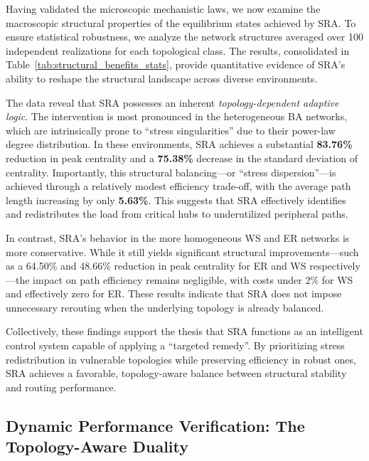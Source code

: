 \documentclass[journal]{IEEEtran}
\theoremstyle{plain}
\theoremstyle{definition}
\begin{document}
Having validated the microscopic mechanistic laws, we now examine the macroscopic structural properties of the equilibrium states achieved by SRA. 
To ensure statistical robustness, we analyze the network structures averaged over 100 independent realizations for each topological class. 
The results, consolidated in Table~\ref{tab:structural_benefits_stats}, provide quantitative evidence of SRA's ability to reshape the structural landscape across diverse environments.

The data reveal that SRA possesses an inherent \textit{topology-dependent adaptive logic}. 
The intervention is most pronounced in the heterogeneous BA networks, which are intrinsically prone to ``stress singularities'' due to their power-law degree distribution. 
In these environments, SRA achieves a substantial \textbf{83.76\%} reduction in peak centrality and a \textbf{75.38\%} decrease in the standard deviation of centrality. 
Importantly, this structural balancing---or ``stress dispersion''---is achieved through a relatively modest efficiency trade-off, with the average path length increasing by only \textbf{5.63\%}. 
This suggests that SRA effectively identifies and redistributes the load from critical hubs to underutilized peripheral paths.

In contrast, SRA's behavior in the more homogeneous WS and ER networks is more conservative. 
While it still yields significant structural improvements---such as a 64.50\% and 48.66\% reduction in peak centrality for ER and WS respectively---the impact on path efficiency remains negligible, with costs under 2\% for WS and effectively zero for ER. 
These results indicate that SRA does not impose unnecessary rerouting when the underlying topology is already balanced.

Collectively, these findings support the thesis that SRA functions as an intelligent control system capable of applying a ``targeted remedy''. 
By prioritizing stress redistribution in vulnerable topologies while preserving efficiency in robust ones, SRA achieves a favorable, topology-aware balance between structural stability and routing performance.

\subsection{Dynamic Performance Verification: The Topology-Aware Duality}
\label{subsec:dynamic_performance}
\end{document}
